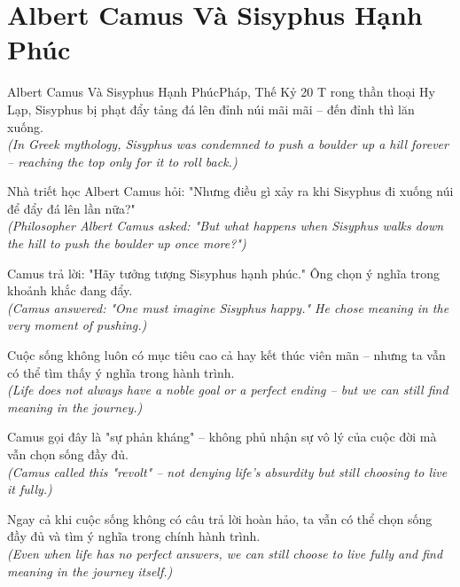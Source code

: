 \section{Albert Camus Và Sisyphus Hạnh Phúc}
\begin{truyen}{Albert Camus Và Sisyphus Hạnh Phúc}{Pháp, Thế Kỷ 20}
T rong thần thoại Hy Lạp, Sisyphus bị phạt đẩy tảng đá lên đỉnh núi mãi mãi -- đến đỉnh thì lăn xuống.\\
\textit{(In Greek mythology, Sisyphus was condemned to push a boulder up a hill forever -- reaching the top only for it to roll back.)}

Nhà triết học Albert Camus hỏi: "Nhưng điều gì xảy ra khi Sisyphus đi xuống núi để đẩy đá lên lần nữa?"\\
\textit{(Philosopher Albert Camus asked: "But what happens when Sisyphus walks down the hill to push the boulder up once more?")}

Camus trả lời: "Hãy tưởng tượng Sisyphus hạnh phúc." Ông chọn ý nghĩa trong khoảnh khắc đang đẩy.\\
\textit{(Camus answered: "One must imagine Sisyphus happy." He chose meaning in the very moment of pushing.)}

Cuộc sống không luôn có mục tiêu cao cả hay kết thúc viên mãn -- nhưng ta vẫn có thể tìm thấy ý nghĩa trong hành trình.\\
\textit{(Life does not always have a noble goal or a perfect ending -- but we can still find meaning in the journey.)}

Camus gọi đây là "sự phản kháng" -- không phủ nhận sự vô lý của cuộc đời mà vẫn chọn sống đầy đủ.\\
\textit{(Camus called this "revolt" -- not denying life's absurdity but still choosing to live it fully.)}

\end{truyen}
\begin{baihoc}
  Ngay cả khi cuộc sống không có câu trả lời hoàn hảo, ta vẫn có thể chọn sống đầy đủ và tìm ý nghĩa trong chính hành trình.\\
  \textit{(Even when life has no perfect answers, we can still choose to live fully and find meaning in the journey itself.)}
\end{baihoc}
